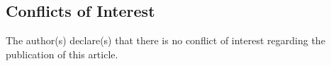 \documentclass{article}
\begin{document}
\subsection*{Conflicts of Interest}
The author(s) declare(s) that there is no conflict of interest regarding the publication of this article.











\end{document}
